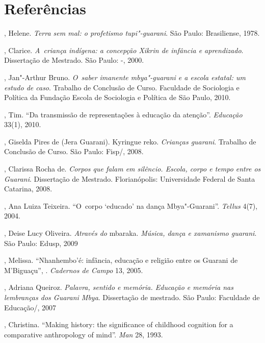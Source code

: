 \section{Referências}

\begin{samepage}
\begin{Parskip}
, Helene. \emph{Terra sem mal: o profetismo tupi"-guarani}. São
Paulo: Brasiliense, 1978.

, Clarice. \emph{A~criança indígena: a concepção Xikrin de infância
e aprendizado}. Dissertação de Mestrado. São Paulo: -, 2000.

, Jan"-Arthur Bruno. \emph{O~saber imanente mbya"-guarani e a escola
estatal: um estudo de caso}. Trabalho de Conclusão de Curso. Faculdade
de Sociologia e Política da Fundação Escola de Sociologia e Política de
São Paulo, 2010.

, Tim. ``Da transmissão de representações à educação da
atenção''. \emph{Educação} 33(1), 2010.

, Giselda Pires de (Jera Guarani). Kyringue reko. \emph{Crianças
guarani}. Trabalho de Conclusão de Curso. São Paulo: Fisp/, 2008.

, Clarissa Rocha de. \emph{Corpos que falam em silêncio. Escola,
corpo e tempo entre os Guarani}. Dissertação de Mestrado.
Florianópolis: Universidade Federal de Santa Catarina, 2008.

, Ana Luiza Teixeira. ``O~corpo `educado' na dança
Mbya"-Guarani''. \emph{Tellus} 4(7), 2004.

, Deise Lucy Oliveira. \emph{Através do} mbaraka. \emph{Música, dança e
xamanismo guarani}. São Paulo: Edusp, 2009

, Melissa. ``Nhanhembo’é: infância, educação e religião
entre os Guarani de M’Biguaçu'', . \emph{Cadernos de Campo} 13, 2005.

, Adriana Queiroz. \emph{Palavra, sentido e memória. Educação e
memória nas lembranças dos Guarani Mbya}. Dissertação de mestrado. São
Paulo: Faculdade de Educação/, 2007

, Christina. ``Making history: the significance of childhood
cognition for a comparative anthropology of mind''. \emph{Man} 28, 1993.
\end{Parskip}
\end{samepage}

